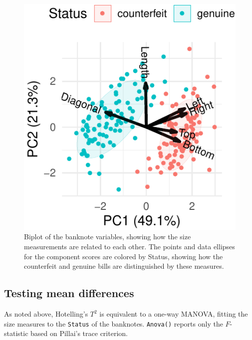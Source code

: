 \documentclass[
  letterpaper,
  10pt,
  krantz2]{krantz}
\begin{document}
\begin{figure}[H]

{\centering \includegraphics[width=1\textwidth,height=\textheight]{figs/fig-banknote-biplot-1.pdf}

}

\caption{\label{fig-banknote-biplot}Biplot of the banknote variables,
showing how the size measurements are related to each other. The points
and data ellipses for the component scores are colored by Status,
showing how the counterfeit and genuine bills are distinguished by these
measures.}

\end{figure}

\hypertarget{testing-mean-differences}{%
\subsection{Testing mean differences}\label{testing-mean-differences}}

As noted above, Hotelling's \(T^2\) is equivalent to a one-way MANOVA,
fitting the size measures to the \texttt{Status} of the banknotes.
\texttt{Anova()} reports only the \(F\)-statistic based on Pillai's
trace criterion.
\end{document}
